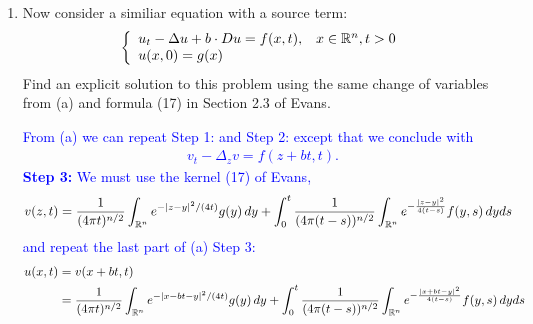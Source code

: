 \documentclass[10pt,a4paper]{report}
\newcommand{\BLUE}[1]{\textcolor{blue}{#1}}
\begin{document}
\begin{enumerate}
\begin{enumerate}[label=(\alph*)]
\BLUE{
	\textbf{Step 1: }Solve $x$ in terms of $z$ and define the substitution 
	\begin{align*}
		x &= z-bt \\
		v(z,t) &= u(z+bt,t) \\
		v_t &= u_t+ b\cdot \Delta_x u, \quad \nabla_z v = \nabla_x u, \quad \Delta_z v = \Delta_x u
	\end{align*}\textbf{Step 2: }Substituting into the original equation
	\begin{align*}
		u_t - \Delta_x u + b\cdot Du &= (v_t-b\cdot D_xu)-\Delta_x + b \cdot D_xu = v_t - \Delta_z v = 0
	\end{align*}Thus $v$ is a solution to the original Heat Equation with initial state $v(z,0) = u(x,0) = g(0)$.  \\
	\textbf{Step 3: }Now applying this to the Heat Kernel.
	\begin{align*}
		v(z,t)&=\int_{\mathbb{R}^n}\Phi(z-y,t),g(y)\,dy\\
		&=\frac{1}{(4\pi t)^{n/2}}\int_{\mathbb{R}^n}e^{-|z-y|^2/(4t)} g(y)\, dy
	\end{align*}Recall that 
	\begin{align*}
		u(x,t) &= v(x+bt, t) \\
			&= \frac{1}{(4\pi t)^{n/2}}\int_{\mathbb{R}^n}e^{-|x-bt-y|^2/(4t)} g(y)\, dy
	\end{align*}
}

	\item Now consider a similiar equation with a source term:
	\begin{align*}
		\left \{ \begin{array}{ll} u_t-\Delta u+b\cdot Du=f(x,t), & x\in \mathbb{R}^n, t>0\\ u(x,0)=g(x) \end{array} \right .
	\end{align*}Find an explicit solution to this problem using the same change of variables from (a) and formula (17) in Section 2.3 of Evans.
	
	\BLUE{From (a) we can repeat Step 1: and Step 2: except that we conclude with
	\begin{align*}
		v_t-\Delta_zv = f(z+bt,t).
	\end{align*}\textbf{Step 3: }We must use the kernel (17) of Evans,  
	\begin{align*}
		v(z,t) &= \frac{1}{(4\pi t)^{n/2}}\int_{\mathbb{R}^n}e^{-|z-y|^2/(4t)} g(y)\, dy + \int_0^t \frac{1}{(4\pi(t-s))^{n/2}} \int_{\mathbb{R}^n} e^{-\frac{|z-y|^2}{4(t-s)}} f(y,s)\, dyds
	\end{align*}and repeat the last part of (a) Step 3:
	\begin{align*}
		u(x,t) &= v(x+bt,t)\\
			&= \frac{1}{(4\pi t)^{n/2}}\int_{\mathbb{R}^n}e^{-|x-bt-y|^2/(4t)} g(y)\, dy + \int_0^t \frac{1}{(4\pi(t-s))^{n/2}} \int_{\mathbb{R}^n} e^{-\frac{|x+bt-y|^2}{4(t-s)}} f(y,s)\, dyds
	\end{align*}
	}
	

\end{enumerate}
\end{enumerate}
\end{document}
